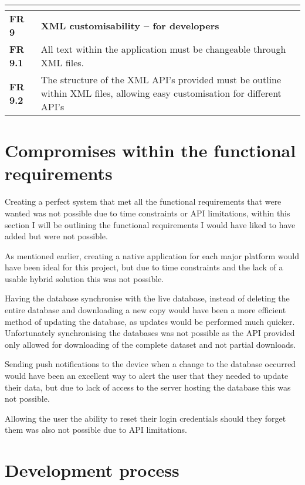\begin{center}
\begin{longtable}{| l | p{13cm} |}
\textbf{}  &  \\ \hline
\textbf{FR 9}   & \textbf{XML customisability – for developers} \\ \hline
\textbf{FR 9.1} & All text within the application must be changeable through XML files.  \\ \hline
\textbf{FR 9.2} & The structure of the XML API’s provided must be outline within XML files, allowing easy customisation for different API’s\\ \hline 
\end{longtable}
\end{center}

\section{Compromises within the functional requirements }

Creating a perfect system that met all the functional requirements that were wanted was not possible due to time constraints or API limitations, within this section I will be outlining the functional requirements I would have liked to have added but were not possible.

As mentioned earlier, creating a native application for each major platform would have been ideal for this project, but due to time constraints and the lack of a usable hybrid solution this was not possible.

Having the database synchronise with the live database, instead of deleting the entire database and downloading a new copy would have been a more efficient method of updating the database, as updates would be performed much quicker. Unfortunately synchronising the databases was not possible as the API provided only allowed for downloading of the complete dataset and not partial downloads.

Sending push notifications to the device when a change to the database occurred would have been an excellent way to alert the user that they needed to update their data, but due to lack of access to the server hosting the database this was not possible. 

Allowing the user the ability to reset their login credentials should they forget them was also not possible due to API limitations.

\section{Development process}

